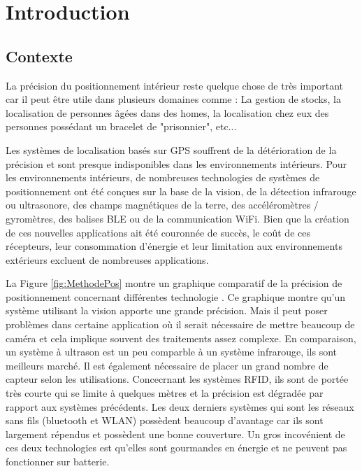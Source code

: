 \chapter{Introduction}

\section{Contexte}
La précision du positionnement intérieur reste quelque chose de très important car il peut être utile dans plusieurs domaines comme : La gestion de stocks, la localisation de personnes âgées dans des homes, la localisation chez eux des personnes possédant un bracelet de "prisonnier", etc...

Les systèmes de localisation basés sur GPS souffrent de la détérioration de la précision et sont presque indisponibles dans les environnements intérieurs. Pour les environnements intérieurs, de nombreuses technologies de systèmes de positionnement ont été conçues sur la base de la vision, de la détection infrarouge ou ultrasonore, des champs magnétiques de la terre, des accéléromètres / gyromètres, des balises BLE ou de la communication WiFi. Bien que la création de ces nouvelles applications ait été couronnée de succès, le coût de ces récepteurs, leur consommation d’énergie et leur limitation aux environnements extérieurs excluent de nombreuses applications.

La Figure \ref{fig:MethodePos} montre un graphique comparatif de la précision de positionnement concernant différentes technologie \cite{INPOS}. Ce graphique montre qu'un système utilisant la vision apporte une grande précision. Mais il peut poser problèmes dans certaine application où il serait nécessaire de mettre beaucoup de caméra et cela implique souvent des traitements assez complexe. En comparaison, un système à ultrason est un peu comparble à un système infrarouge, ils sont meilleurs marché. Il est également nécessaire de placer un grand nombre de capteur selon les utilisations. Concecrnant les systèmes RFID, ils sont de portée très courte qui se limite à quelques mètres et la précision est dégradée par rapport aux systèmes précédents. Les deux derniers systèmes qui sont les réseaux sans fils (bluetooth et WLAN) possèdent beaucoup d'avantage car ils sont largement répendus et possèdent une bonne couverture. Un gros incovénient de ces deux technologies est qu'elles sont gourmandes en énergie et ne peuvent pas fonctionner sur batterie.

